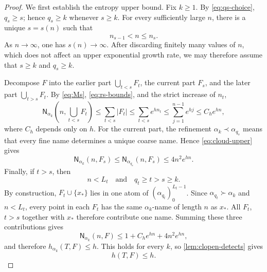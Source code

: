\documentclass[10pt,a4paper]{amsart}
\newcommand{\Nname}{\mathsf N}
\numberwithin{equation}{section}
\begin{document}
\begin{proof}
		We first establish the entropy upper bound.  Fix $k\geq1$.  By
		\eqref{eq:qs-choice}, $q_s\geq s$; hence $q_s\geq k$ whenever $s\geq k$.
		For every sufficiently large $n$, there is a unique $s=s(n)$ such that
		\begin{equation}
			n_{s-1}<n\leq n_s.
			\label{eq:stage-containing-n}
		\end{equation}
		As $n\to\infty$, one has $s(n)\to\infty$.  After discarding finitely many
		values of $n$, which does not affect an upper exponential growth rate, we may
		therefore assume that $s\geq k$ and $q_s\geq k$.

		Decompose $F$ into the earlier part $\bigcup_{t<s}F_t$, the current part $F_s$, and the later part $\bigcup_{t>s}F_t$.  
		By
		\eqref{eq:Ms}, \eqref{eq:rs-bounds}, and the strict increase of 
		$n_t$,
		\[
		\Nname_{\alpha_k}\left(n,\bigcup_{t<s}F_t\right)
		\leq\sum_{t<s}|F_t|
		\leq
		\sum_{t<s}e^{hn_t}
		\leq
		\sum_{j=1}^{n-1}e^{hj}
		\leq C_he^{hn},
		\]
		where $C_h$ depends only on $h$.  For the current part, the refinement
		$\alpha_k\prec\alpha_{q_s}$ means that every fine name determines a unique
		coarse name.  Hence \eqref{eq:cloud-upper} gives
		\begin{equation}
			\Nname_{\alpha_k}(n,F_s)
			\leq
			\Nname_{\alpha_{q_s}}(n,F_s)
			\leq4n^2e^{hn}.
			\label{eq:current-cloud-upper}
		\end{equation}
		Finally, if $t>s$, then
		\[
			n<L_t\quad\text{and}\quad q_t\geq t>s\geq k.
		\]
		By construction, $F_t\cup\{x_*\}$ lies in one atom of
		$(\alpha_{q_t})_0^{L_t-1}$.  Since $\alpha_{q_t} \succ \alpha_k$ and
		$n<L_t$, every point in each $F_t$ has the same
		$\alpha_k$-name of length $n$ as $x_*$.  All $F_t$, $t>s$  together with $x_*$ therefore
		contribute one name.  Summing these three contributions gives
		\begin{equation}
			\Nname_{\alpha_k}(n,F)
			\leq
			1+C_he^{hn}+4n^2e^{hn},
			\label{eq:global-upper}
		\end{equation}
		and therefore
		$h_{\alpha_k}(T,F)\leq h$.  This holds for every $k$, so
		\cref{lem:clopen-detects} gives
		\begin{equation}
			h(T,F)\leq h.
			\label{eq:entropy-upper}
		\end{equation}
		

\end{proof}
\end{document}
